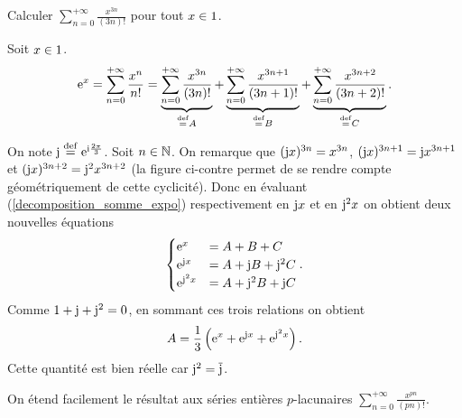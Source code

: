 \begin{exercice}
Calculer $\sum\limits_{n=0}^{+ \infty} \frac{x^{3n}}{(3n)!}$ pour tout $x \in 1$.
\end{exercice}

\begin{solution}
Soit $x \in 1$. 
\begin{align} \label{decomposition_somme_expo}
    \mathrm{e}^x = \sum_{n=0}^{+ \infty} \frac{x^n}{n!} = \underbrace{\sum_{n=0}^{+ \infty} \frac{x^{3n}}{(3n)!}}_{ \overset{\mathrm{\tiny def}}{=} A} + \underbrace{\sum_{n=0}^{+ \infty} \frac{x^{3n+1}}{(3n+1)!}}_{\overset{\mathrm{\tiny def}}{=} B} + \underbrace{\sum_{n=0}^{+ \infty} \frac{x^{3n+2}}{(3n+2)!}}_{\overset{\mathrm{\tiny def}}{=} C}.
\end{align}


On note $\mathrm{j} \overset{\mathrm{\tiny def}}{=} \mathrm{e}^{\mathrm{i} \frac{2\pi}{3}}$. Soit $n \in \mathbb{N}$. On remarque que $(\mathrm{j} x)^{3n} = x^{3n}$, $(\mathrm{j} x)^{3n+1} = \mathrm{j} x^{3n+1}$ et $(\mathrm{j} x)^{3n+2} = \mathrm{j}^2 x^{3n+2}$ (la figure ci-contre permet de se rendre compte géométriquement de cette cyclicité). Donc en évaluant (\ref{decomposition_somme_expo}) respectivement en $\mathrm{j} x$ et en $\mathrm{j}^2 x$ on obtient deux nouvelles équations
$$\begin{cases}
    \mathrm{e}^x &= A + B + C \\
    \mathrm{e}^{\mathrm{j} x} &= A + \mathrm{j} B + \mathrm{j}^2 C \\
    \mathrm{e}^{\mathrm{j}^2 x} &= A + \mathrm{j}^2 B + \mathrm{j} C
\end{cases}.$$
Comme $1 + \mathrm{j} + \mathrm{j}^2 = 0$, en sommant ces trois relations on obtient
$$A = \frac{1}{3} \left(\mathrm{e}^x + \mathrm{e}^{\mathrm{j} x}+ \mathrm{e}^{\mathrm{j}^2 x} \right).$$
Cette quantité est bien réelle car $\mathrm{j}^2 = \overline{\mathrm{j}}$.
\end{solution}

\begin{remarque}
    On étend facilement le résultat aux séries entières $p$-lacunaires $\sum\limits_{n=0}^{+ \infty} \frac{x^{pn}}{(pn)!}$.
\end{remarque}